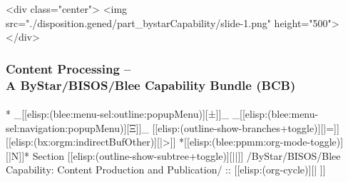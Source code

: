 \begin{whenOrg}
\begin{htmlonly}

\begin{frame}[fragile,plain,label=part_bystarCapability]
    \frametitle{}
    \framesubtitle{}
    \begin{rawhtml}
<div class="center">
<img src="./disposition.gened/part_bystarCapability/slide-1.png" height="500">
</div>
    \end{rawhtml}
\end{frame}
\end{htmlonly}

\begin{verblatex}

\begin{frame}[fragile,label=part_bystarCapability]
    \frametitle{Content Processing --\\ A ByStar/BISOS/Blee Capability Bundle (BCB)}
    \framesubtitle{}

    \tableofcontents


\end{frame}
\end{verblatex}




\begin{whenOrg}
*  _[[elisp:(blee:menu-sel:outline:popupMenu)][±]]_ _[[elisp:(blee:menu-sel:navigation:popupMenu)][Ξ]]_ [[elisp:(outline-show-branches+toggle)][|=]] [[elisp:(bx:orgm:indirectBufOther)][|>]] *[[elisp:(blee:ppmm:org-mode-toggle)][|N]]*  Section    [[elisp:(outline-show-subtree+toggle)][||]]   /ByStar/BISOS/Blee Capability: Content Production and Publication/ ::  [[elisp:(org-cycle)][| ]]
\end{whenOrg}


\end{whenOrg}
